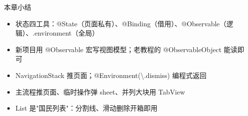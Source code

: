 \begin{tcbsummary}{本章小结}
\begin{itemize}
  \item 状态四工具：@State（页面私有）、@Binding（借用）、@Observable（逻辑）、.environment（全局）
  \item 新项目用 @Observable 宏写视图模型；老教程的 @ObservableObject 能读即可
  \item NavigationStack 推页面；@Environment(\textbackslash{}.dismiss) 编程式返回
  \item 主流程推页面、临时操作弹 sheet、并列大块用 TabView
  \item List 是"国民列表"：分割线、滑动删除开箱即用
\end{itemize}

\end{tcbsummary}

